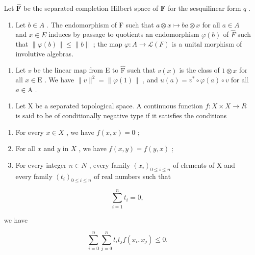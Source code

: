 Let \(\widehat{\mathbf{F}}\) be the separated completion Hilbert space of \(\mathbf{F}\) for the sesquilinear form \(q\) .

\begin{enumerate}
\def\labelenumi{\alph{enumi})}
\setcounter{enumi}{2}
\tightlist
\item
  Let \(b \in A\) . The endomorphism of F such that \(a \otimes x \mapsto ba \otimes x\) for all \(a \in A\) and \(x \in E\) induces by passage to quotients an endomorphism \(\varphi(b)\) of \(\widehat{F}\) such that \(\|\varphi(b)\|\leqslant\|b\|\) ; the map \(\varphi\colon A\to\mathcal{L}(F)\) is a unital morphism of involutive algebras.
\end{enumerate}

\begin{enumerate}
\def\labelenumi{\alph{enumi})}
\setcounter{enumi}{3}
\tightlist
\item
  Let \(v\) be the linear map from E to \(\widehat{\mathrm{F}}\) such that \(v(x)\) is the class of \(1 \otimes x\) for all \(x \in \mathrm{E}\) . We have \(\|v\|^2 = \| \varphi(1)\|\) , and \(u(a) = v^* \circ \varphi(a) \circ v\) for all \(a \in \mathrm{A}\) .
\end{enumerate}

\begin{enumerate}
\def\labelenumi{\arabic{enumi})}
\setcounter{enumi}{4}
\tightlist
\item
  Let X be a separated topological space. A continuous function \(f: X \times X \to R\) is said to be of conditionally negative type if it satisfies the conditions
\end{enumerate}

\begin{enumerate}
\def\labelenumi{(\roman{enumi})}
\item
  For every \(x \in X\) , we have \(f(x, x) = 0\) ;
\item
  For all \(x\) and \(y\) in \(X\) , we have \(f(x,y) = f(y,x)\) ;
\item
  For every integer \(n \in N\) , every family \((x_{i})_{0 \leqslant i \leqslant n}\) of elements of X and every family \((t_{i})_{0 \leqslant i \leqslant n}\) of real numbers such that
\end{enumerate}

\[
\sum_ {i = 1} ^ {n} t _ {i} = 0,
\]

we have

\[
\sum_ {i = 0} ^ {n} \sum_ {j = 0} ^ {n} t _ {i} t _ {j} f (x _ {i}, x _ {j}) \leqslant 0.
\]

